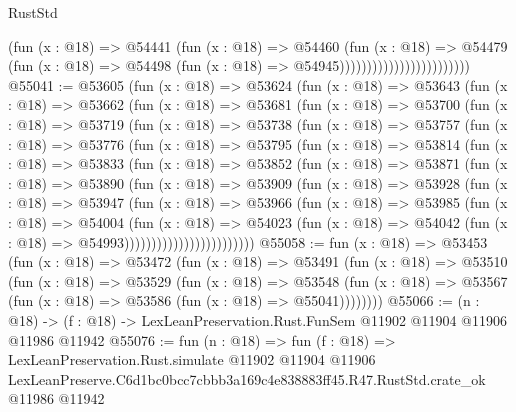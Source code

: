 \begin{lexlean}{RustStd}
\begin{coremodule}
                                          (fun (x : @18) =>
                                          @54441
                                            (fun (x : @18) =>
                                            @54460
                                              (fun (x : @18) =>
                                              @54479
                                                (fun (x : @18) =>
                                                @54498
                                                  (fun (x : @18) => @54945))))))))))))))))))))))))
@55041 := @53605
    (fun (x : @18) =>
    @53624
      (fun (x : @18) =>
      @53643
        (fun (x : @18) =>
        @53662
          (fun (x : @18) =>
          @53681
            (fun (x : @18) =>
            @53700
              (fun (x : @18) =>
              @53719
                (fun (x : @18) =>
                @53738
                  (fun (x : @18) =>
                  @53757
                    (fun (x : @18) =>
                    @53776
                      (fun (x : @18) =>
                      @53795
                        (fun (x : @18) =>
                        @53814
                          (fun (x : @18) =>
                          @53833
                            (fun (x : @18) =>
                            @53852
                              (fun (x : @18) =>
                              @53871
                                (fun (x : @18) =>
                                @53890
                                  (fun (x : @18) =>
                                  @53909
                                    (fun (x : @18) =>
                                    @53928
                                      (fun (x : @18) =>
                                      @53947
                                        (fun (x : @18) =>
                                        @53966
                                          (fun (x : @18) =>
                                          @53985
                                            (fun (x : @18) =>
                                            @54004
                                              (fun (x : @18) =>
                                              @54023
                                                (fun (x : @18) =>
                                                @54042
                                                  (fun (x : @18) => @54993))))))))))))))))))))))))
@55058 := fun (x : @18) =>
  @53453
    (fun (x : @18) =>
    @53472
      (fun (x : @18) =>
      @53491
        (fun (x : @18) =>
        @53510
          (fun (x : @18) =>
          @53529
            (fun (x : @18) =>
            @53548
              (fun (x : @18) => @53567 (fun (x : @18) => @53586 (fun (x : @18) => @55041))))))))
@55066 := (n : @18) ->
  (f : @18) -> LexLeanPreservation.Rust.FunSem @11902 @11904 @11906 @11986 @11942
@55076 := fun (n : @18) =>
  fun (f : @18) =>
  LexLeanPreservation.Rust.simulate
    @11902
    @11904
    @11906
    LexLeanPreserve.C6d1bc0bcc7cbbb3a169c4e838883ff45.R47.RustStd.crate_ok
    @11986
    @11942
\end{coremodule}
\end{lexlean}
